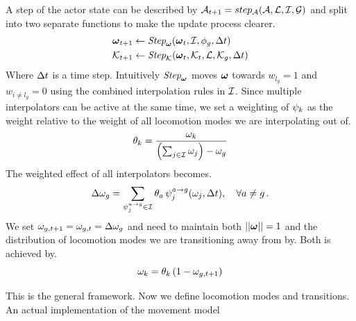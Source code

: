 A step of the actor state can be described by $\mathcal{A}_{t+1} = step_{\mathcal{A}}(\mathcal{A}, \mathcal{L}, \mathcal{I}, \mathcal{G})$ and split into two separate functions to make the update process clearer.
\begin{subequations}
\begin{align}
    \boldsymbol{\omega }_{t+1} &\leftarrow \textit{Step}_{\boldsymbol{\omega }}( \boldsymbol{\omega }_{t}, \mathcal{I}, \phi_g, \Delta{t}) \label{eq:step:interpolators}\\
    \mathcal{K}_{t+1} &\leftarrow  \textit{Step}_{\mathcal{K}}(\boldsymbol{\omega }_t, \mathcal{K}_{t},  \mathcal{L}, \mathcal{K}_{g}, \Delta{t} )\label{eq:step:kinematics}
\end{align}
\end{subequations}
Where $\Delta{t}$ is a time step. Intuitively $\textit{Step}_{\boldsymbol{\omega }}$ moves $\boldsymbol{\omega }$ towards $w_{l_{g}}=1$ and $w_{i\neq{l_g}}=0$ using the combined interpolation rules in $\mathcal{I}$. Since multiple interpolators can be active at the same time, we set a weighting of $\psi_k$ as the weight relative to the weight of all locomotion modes we are interpolating out of. 
\begin{equation}
\theta_{k}=\dfrac{\omega_k}{\left(\sum_{j\in\mathcal{I}}\omega_j\right)-\omega_g}
\end{equation}
The weighted effect of all interpolators becomes.
\begin{equation}
\Delta{ \omega }_g = \sum_{\psi_j^{a\rightarrow g} \in \mathcal{I}}\theta_a \, \psi_j^{a\rightarrow g}(\omega_j,\Delta{t}),
\quad \forall a \neq g \,.
\end{equation}
We set $\omega_{g,t+1}=\omega_{g,t}=\Delta{ \omega }_g$ and need to maintain both $||\boldsymbol{\omega }||=1$ and the distribution of locomotion modes we are transitioning away from by. Both is achieved by.
\begin{equation}
\omega_k = \theta_k \, (1-\omega_{g,t+1})  
\end{equation}



This is the general framework. Now we define locomotion modes and transitions. An actual implementation of the movement model

